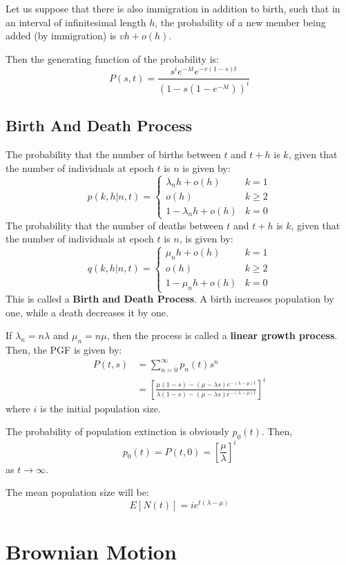 \documentclass[12pt,letterpaper]{book}
\theoremstyle{definition}
\begin{document}
Let us suppose that there is also immigration in addition to birth, such that in an interval of infinitesimal length $h$, the probability of a new member being added (by immigration) is $vh + o(h)$.

Then the generating function of the probability is:
\[P(s,t) = \frac{s^i e^{-\lambda t} e^{-v(1-s)t}}{(1 - s(1- e^{-\lambda t}))^i}\]

\section{Birth And Death Process}

The probability that the number of births between $t$ and $t+h$ is $k$, given that the number of individuals at epoch $t$ is $n$ is given by:
\[p(k,h|n,t) = \begin{cases}
  \lambda_n h + o(h) & k = 1 \\
   o(h) & k \geq 2 \\
  1-\lambda_n h + o(h) & k = 0
\end{cases}\]
The probability that the number of deaths between $t$ and $t+h$ is $k$, given that the number of individuals at epoch $t$ is $n$, is given by:
\[q(k,h|n,t) = \begin{cases}
  \mu_n h + o(h) & k = 1 \\
  o(h) & k \geq 2 \\
  1-\mu_n h + o(h) & k = 0
\end{cases}\]
This is called a \textbf{Birth and Death Process}. A birth increases population by one, while a death decreases it by one.

If $\lambda_n = n \lambda $ and $\mu_n = n \mu$, then the process is called a \textbf{linear growth process}. Then, the PGF is given by:
\begin{align*}
  P(t,s) &= \sum_{n=0}^\infty p_n(t) s^n  \\
         &= \left[ \frac{\mu(1-s) - (\mu - \lambda s) e^{-(\lambda -\mu)t}}{\lambda(1-s) - (\mu - \lambda s) e^{-(\lambda -\mu)t}} \right]^i
\end{align*}
where $i$ is the initial population size.

The probability of population extinction is obviously $p_0(t)$. Then,
\[p_0(t) = P(t,0) = \left [ \frac{\mu}{\lambda} \right]^i\]
as $t \rightarrow \infty$.

The mean population size will be:
\[E[N(t)] = i e^{t(\lambda - \mu)}\]

\chapter{Brownian Motion}
\end{document}
